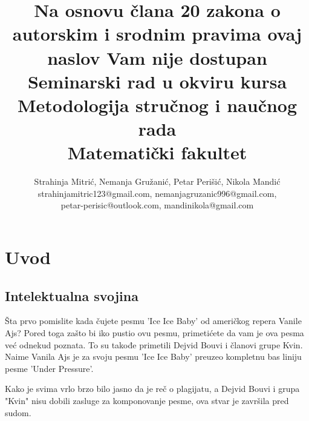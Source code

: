 \documentclass[a4paper]{article}
\begin{document}
\title{\vspace{-3.0cm}Na osnovu člana 20 zakona o autorskim i srodnim pravima ovaj naslov Vam nije dostupan\\
\large \vspace{0.5cm}Seminarski rad u okviru kursa\\Metodologija stručnog i naučnog rada\\ Matematički fakultet}

\author{Strahinja Mitrić, Nemanja Gružanić, Petar Perišić, Nikola Mandić\\ strahinjamitric123@gmail.com, nemanjagruzanic996@gmail.com,\\ petar-perisic@outlook.com, mandinikola@gmail.com
}

\maketitle



\tableofcontents

\newpage

\section{Uvod}
\label{sec:uvod}
\subsection{Intelektualna svojina}
Šta prvo pomislite kada čujete pesmu 'Ice Ice Baby' od američkog repera Vanile Ajs?
Pored toga zašto bi iko pustio ovu pesmu, primetićete da vam je ova pesma već odnekud poznata.
To su takođe primetili Dejvid Bouvi i članovi grupe Kvin.
Naime Vanila Ajs je za svoju pesmu 'Ice Ice Baby' preuzeo kompletnu bas liniju pesme 'Under Pressure'.

Kako je svima vrlo brzo bilo jasno da je reč o plagijatu, a Dejvid Bouvi i grupa "Kvin" nisu dobili
zasluge za komponovanje pesme, ova stvar je završila pred sudom.
\end{document}
